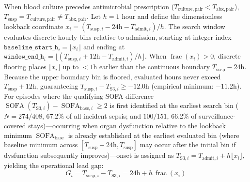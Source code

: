 \documentclass[12pt,a4paper]{article}
\begin{document}
When blood culture precedes antimicrobial prescription ($T_{\mathrm{culture,pair}} < T_{\mathrm{abx,pair}}$), $T_{\mathrm{susp}} = T_{\mathrm{culture,pair}} \ne T_{\mathrm{abx,pair}}$. Let $h = 1\text{ hour}$ and define the dimensionless lookback coordinate $x_i = (T_{\mathrm{susp}, i} - 24\text{h} - T_{\text{admit}, i})/h$. The search window evaluates discrete hourly bins relative to admission, starting at integer index $\texttt{baseline\_start\_h}_i = \lfloor x_i \rfloor$ and ending at $\texttt{window\_end\_h}_i = \lfloor(T_{\mathrm{susp}, i} + 12\text{h} - T_{\text{admit}, i})/h\rfloor$. When $\operatorname{frac}(x_i) > 0$, discrete flooring places $\lfloor x_i \rfloor$ up to $<1\text{h}$ earlier than the continuous boundary $T_{\mathrm{susp}} - 24\text{h}$. Because the upper boundary bin is floored, evaluated hours never exceed $T_{\mathrm{susp}} + 12\text{h}$, guaranteeing $T_{\mathrm{susp}, i} - T_{\text{S3}, i} \ge -12.0\text{h}$ (empirical minimum: $-11.2\text{h}$). For episodes where the qualifying SOFA difference $\operatorname{SOFA}(T_{\mathrm{S3}, i}) - \operatorname{SOFA}_{\mathrm{base}, i} \ge 2$ is first identified at the earliest search bin ($N=274/408$, 67.2\% of all incident sepsis; and $100/151$, 66.2\% of surveillance-covered stays)—occurring when organ dysfunction relative to the lookback minimum $\operatorname{SOFA}_{\mathrm{base}}$ is already established at the earliest evaluated bin (where baseline minimum across $[T_{\mathrm{susp}}-24\mathrm{h}, T_{\mathrm{susp}}]$ may occur after the initial bin if dysfunction subsequently improves)—onset is assigned as $T_{\text{S3}, i} = T_{\text{admit}, i} + h\lfloor x_i \rfloor$, yielding the operational lead gap:
\begin{equation}
G_i = T_{\mathrm{susp}, i} - T_{\text{S3}, i} = 24\text{h} + h\,\operatorname{frac}(x_i)
\end{equation}
\end{document}
